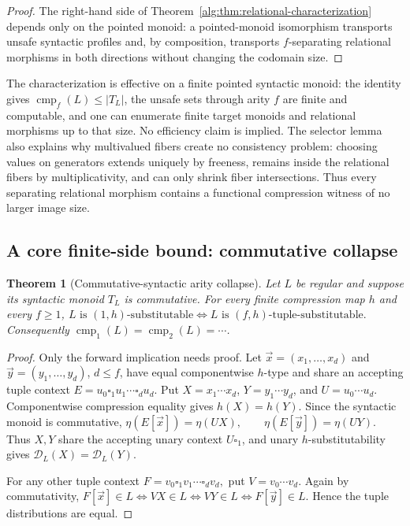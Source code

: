 \documentclass[10pt,a4paper]{article}
\newtheorem{theorem}{Theorem}[section]
\theoremstyle{definition}
\theoremstyle{remark}
\newcommand{\cmp}{\operatorname{cmp}}
\newcommand{\D}{\mathcal D}
\newcommand{\blank}{\square}
\begin{document}
\begin{proof}
The right-hand side of Theorem~\ref{alg:thm:relational-characterization}
depends only on the pointed monoid: a pointed-monoid isomorphism transports
unsafe syntactic profiles and, by composition, transports
\(f\)-separating relational morphisms in both directions without changing
the codomain size.
\end{proof}

The characterization is effective on a finite pointed syntactic monoid:
the identity gives \(\cmp_f(L)\le |T_L|\), the unsafe sets through arity
\(f\) are finite and computable, and one can enumerate finite target monoids
and relational morphisms up to that size.  No efficiency claim is implied.
The selector lemma also explains why multivalued fibers create no consistency
problem: choosing values on generators extends uniquely by freeness, remains
inside the relational fibers by multiplicativity, and can only shrink fiber
intersections.  Thus every separating relational morphism contains a
functional compression witness of no larger image size.


\subsection{A core finite-side bound: commutative collapse}

\begin{theorem}[Commutative-syntactic arity collapse]
\label{group:thm:commutative-collapse}
Let \(L\) be regular and suppose its syntactic monoid \(T_L\) is commutative.
For every finite compression map \(h\) and every \(f\ge1\),
\(
L\text{ is }(1,h)\text{-substitutable}
\iff
L\text{ is }(f,h)\text{-tuple-substitutable}.
\)
Consequently \(\cmp_1(L)=\cmp_2(L)=\cdots\).
\end{theorem}

\begin{proof}
Only the forward implication needs proof. Let
\(\vec x=(x_1,\ldots,x_d)\) and \(\vec y=(y_1,\ldots,y_d)\), \(d\le f\),
have equal componentwise \(h\)-type and share an accepting tuple context
\(E=u_0\blank_1u_1\cdots\blank_du_d.\)
Put \(X=x_1\cdots x_d\), \(Y=y_1\cdots y_d\), and
\(U=u_0\cdots u_d\). Componentwise compression equality gives
\(h(X)=h(Y)\). Since the syntactic monoid is commutative, \(\eta(E[\vec x])=\eta(UX), \qquad \eta(E[\vec y])=\eta(UY).\) Thus \(X,Y\) share the accepting unary context \(U\blank_1\), and unary
\(h\)-substitutability gives \(\D_L(X)=\D_L(Y)\).

For any other tuple context
\(F=v_0\blank_1v_1\cdots\blank_dv_d,\)
put \(V=v_0\cdots v_d\). Again by commutativity, \(F[\vec x]\in L \iff VX\in L \iff VY\in L \iff F[\vec y]\in L.\) Hence the tuple distributions are equal.
\end{proof}
\end{document}
